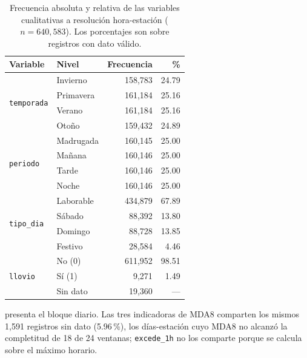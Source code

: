 \begin{table}[pos=t]
  \centering
  \caption{Frecuencia absoluta y relativa de las variables cualitativas a
    resolución hora-estación ($n = 640{,}583$). Los porcentajes son sobre
    registros con dato válido.}
  \label{tab:freq-horaria}
  \small
  \begin{tabular}{llrr}
    \toprule
    Variable & Nivel & Frecuencia & \% \\
    \midrule
    \multirow{4}{*}{\texttt{temporada}}
                                  & Invierno  &   158,783 &  24.79 \\
                                  & Primavera &   161,184 &  25.16 \\
                                  & Verano    &   161,184 &  25.16 \\
                                  & Otoño     &   159,432 &  24.89 \\
    \midrule
    \multirow{4}{*}{\texttt{periodo}}
                                  & Madrugada &   160,145 &  25.00 \\
                                  & Mañana    &   160,146 &  25.00 \\
                                  & Tarde     &   160,146 &  25.00 \\
                                  & Noche     &   160,146 &  25.00 \\
    \midrule
    \multirow{4}{*}{\texttt{tipo\_dia}}
                                  & Laborable &   434,879 &  67.89 \\
                                  & Sábado    &    88,392 &  13.80 \\
                                  & Domingo   &    88,728 &  13.85 \\
                                  & Festivo   &    28,584 &   4.46 \\
    \midrule
    \multirow{3}{*}{\texttt{llovio}}
                                  & No (0)    &   611,952 &  98.51 \\
                                  & Sí (1)    &     9,271 &   1.49 \\
                                  & Sin dato  &    19,360 &    --- \\
    \bottomrule
  \end{tabular}
\end{table}

 presenta el bloque diario. Las tres indicadoras de
MDA8 comparten los mismos 1,591 registros sin dato (5.96\,\%), los
días-estación cuyo MDA8 no alcanzó la completitud de 18 de 24 ventanas;
\texttt{excede\_1h} no los comparte porque se calcula sobre el máximo
horario.

